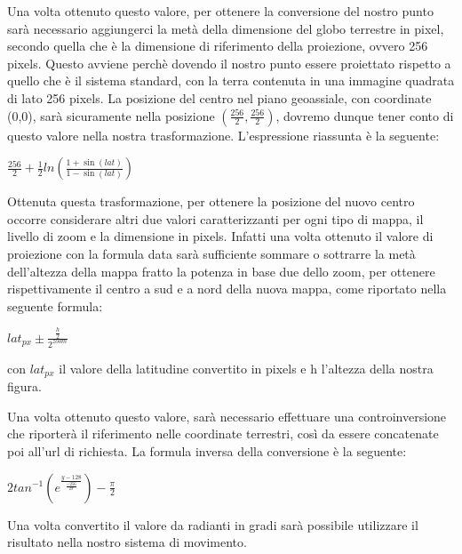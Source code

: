 Una volta ottenuto questo valore, per ottenere la conversione del nostro punto sarà necessario aggiungerci la metà della dimensione del globo terrestre in pixel, secondo quella che è la dimensione di riferimento della proiezione, ovvero 256 pixels. Questo avviene perchè dovendo il nostro punto essere proiettato rispetto a quello che è il sistema standard, con la terra contenuta in una immagine quadrata di lato 256 pixels. La posizione del centro nel piano geoassiale, con coordinate (0,0), sarà sicuramente nella posizione $ (\frac{256}{2}, \frac{256}{2})$, dovremo dunque tener conto di questo valore nella nostra trasformazione. L'espressione riassunta è la seguente:
\begin{center}

	\large$ \frac{256}{2} + \frac{1}{2}ln(\frac{1+\sin(lat)}{1-\sin(lat)}) $\par

\end{center}

Ottenuta questa trasformazione, per ottenere la posizione del nuovo centro occorre considerare altri due valori caratterizzanti per ogni tipo di mappa, il livello di zoom e la dimensione in pixels. Infatti una volta ottenuto il valore di proiezione con la formula data sarà sufficiente sommare o sottrarre la metà dell'altezza della mappa fratto la potenza in base due dello zoom, per ottenere rispettivamente il centro a sud e a nord della nuova mappa, come riportato nella seguente formula:
\begin{center}

	\large $ lat_{px} \pm \frac{\frac{h}{2}}{2^{zoom}} $\par

\end{center}
con $lat_{px}$ il valore della latitudine convertito in pixels e h l'altezza della nostra figura.

Una volta ottenuto questo valore, sarà necessario effettuare una controinversione che riporterà il riferimento nelle coordinate terrestri, così da essere concatenate poi all'url di richiesta.
La formula inversa della conversione è la seguente:
\begin{center}

	\large $2tan^{-1}(e^{\frac{y-128}{\frac{-256}{2\pi}}}) - \frac{\pi}{2}$\par

\end{center}
Una volta convertito il valore da radianti in gradi sarà possibile utilizzare il risultato nella nostro sistema di movimento.

